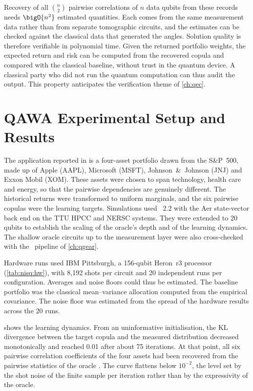 Recovery of all $\binom{n}{2}$ pairwise correlations of $n$ data qubits from these records needs $\bigO{n^{2}}$ estimated quantities. Each comes from the same measurement data rather than from separate tomographic circuits, and the estimates can be checked against the classical data that generated the angles. Solution quality is therefore verifiable in polynomial time. Given the returned portfolio weights, the expected return and risk can be computed from the recovered copula and compared with the classical baseline, without trust in the quantum device. A classical party who did not run the quantum computation can thus audit the output. This property anticipates the verification theme of \cref{ch:qec}.

\section{QAWA Experimental Setup and Results}\label{sec:nisq:qawa-results}

The application reported in \cite{guo2025qawa} is a four-asset portfolio drawn from the S\&P~500, made up of Apple (AAPL), Microsoft (MSFT), Johnson~\&~Johnson (JNJ) and Exxon Mobil (XOM). These assets were chosen to span technology, health care and energy, so that the pairwise dependencies are genuinely different. The historical returns were transformed to uniform marginals, and the six pairwise copulas were the learning targets. Simulations used \qiskit\ 2.2 with the Aer state-vector back end on the TTU HPCC and NERSC systems. They were extended to 20 qubits to establish the scaling of the oracle's depth and of the learning dynamics. The shallow oracle circuits up to the measurement layer were also cross-checked with the \qgear\ pipeline of \cref{ch:qgear}.

Hardware runs used IBM Pittsburgh, a 156-qubit Heron~r3 processor (\cref{tab:nisq:hw}), with 8,192 shots per circuit and 20 independent runs per configuration. Averages and noise floors could thus be estimated. The baseline portfolio was the classical mean--variance allocation computed from the empirical covariance. The noise floor was estimated from the spread of the hardware results across the 20 runs.

 shows the learning dynamics. From an uninformative initialisation, the KL divergence between the target copula and the measured distribution decreased monotonically and reached 0.01 after about 75 iterations. At that point, all six pairwise correlation coefficients of the four assets had been recovered from the pairwise statistics of the oracle \cite{guo2025qawa}. The curve flattens below $10^{-2}$, the level set by the shot noise of the finite sample per iteration rather than by the expressivity of the oracle.

